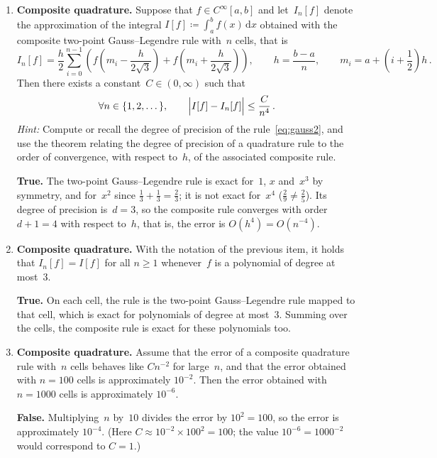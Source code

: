 \documentclass[a4paper]{article}
\renewcommand{\d}{\mathrm d}
\newcommand{\answer}[1]{%
    \ifdefined\showsolutions
        \par\smallskip
        {\small\color{blue!60!black}#1\par}
    \fi
}
\begin{document}
\begin{enumerate}
    \item
        \textbf{Composite quadrature.}
        Suppose that $f \in C^{\infty}[a, b]$ and let~$I_n[f]$ denote the approximation of the integral $I[f] \coloneq \int_a^b f(x) \, \d x$
        obtained with the composite two-point Gauss--Legendre rule with~$n$ cells, that is
        \[
            I_n[f] = \frac{h}{2} \sum_{i=0}^{n-1} \left( f\left(m_i - \frac{h}{2\sqrt{3}}\right) + f\left(m_i + \frac{h}{2\sqrt{3}}\right) \right),
            \qquad h = \frac{b-a}{n}, \qquad m_i = a + \left(i + \frac{1}{2}\right) h\,.
        \]
        Then there exists a constant~$C \in (0, \infty)$ such that
        \[
            \forall n \in \{1, 2, \dotsc\}, \qquad \Bigl\lvert I[f] - I_n[f] \Bigr\rvert \leq \frac{C}{n^4}\,.
        \]
        \emph{Hint:} Compute or recall the degree of precision of the rule~\eqref{eq:gauss2},
        and use the theorem relating the degree of precision of a quadrature rule to the order of convergence, with respect to~$h$, of the associated composite rule.
        \answer{\textbf{True.}
        The two-point Gauss--Legendre rule is exact for~$1$, $x$ and~$x^3$ by symmetry,
        and for~$x^2$ since $\frac13 + \frac13 = \frac23$; it is not exact for~$x^4$ ($\frac29 \neq \frac25$).
        Its degree of precision is~$d = 3$, so the composite rule converges with order $d + 1 = 4$ with respect to~$h$,
        that is, the error is $O(h^4) = O(n^{-4})$.}

    \item
        \textbf{Composite quadrature.}
        With the notation of the previous item, it holds that $I_n[f] = I[f]$ for all $n \geq 1$
        whenever~$f$ is a polynomial of degree at most~3.
        \answer{\textbf{True.}
        On each cell, the rule is the two-point Gauss--Legendre rule mapped to that cell, which is exact for polynomials of degree at most~$3$.
        Summing over the cells, the composite rule is exact for these polynomials too.}

    \item
        \textbf{Composite quadrature.}
        Assume that the error of a composite quadrature rule with~$n$ cells behaves like $C n^{-2}$ for large~$n$,
        and that the error obtained with $n = 100$ cells is approximately $10^{-2}$.
        Then the error obtained with $n = 1000$ cells is approximately $10^{-6}$.
        \answer{\textbf{False.}
        Multiplying~$n$ by~$10$ divides the error by $10^2 = 100$, so the error is approximately $10^{-4}$.
        (Here $C \approx 10^{-2} \times 100^2 = 100$; the value $10^{-6} = 1000^{-2}$ would correspond to $C = 1$.)}


\end{enumerate}
\end{document}
